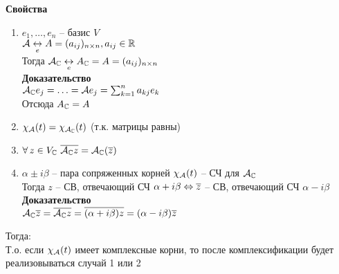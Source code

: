 \documentclass[12pt]{article}
\begin{document}
\textbf{Свойства}
\begin{enumerate}
    \item $e_1, \ldots, e_n$ -- базис $V$\\
    $\mathcal{A} \underset{e}{\leftrightarrow} A = (a_{ij})_{n\times n}, a_{ij} \in \mathbb{R}$\\
    Тогда $\mathcal{A}_\mathbb{C} \underset e{\leftrightarrow} A_\mathbb{C} = A = (a_{ij})_{n\times n}$\\
    \textbf{Доказательство}\\
    $\mathcal{A}_\mathbb{C} e_j = \ldots = \mathcal{A} e_j = \sum_{k=1}^n a_{kj}e_k$\\
    Отсюда $A_\mathbb{C} = A$
    \item $\chi_\mathcal{A}(t) = \chi_{\mathcal{A}_\mathbb{C}}(t)$ (т.к. матрицы равны)
    \item $\forall\, z \in V_\mathbb{C}\ \overline{\mathcal{A}_\mathbb{C} z} = \mathcal{A}_\mathbb{C}(\overline z)$
    \item $\alpha\pm  i\beta$ -- пара сопряженных корней $\chi_\mathcal{A}(t)$ -- СЧ для $\mathcal{A}_\mathbb{C}$\\
    Тогда $z$ -- СВ, отвечающий СЧ $\alpha + i \beta \Leftrightarrow \overline z$ -- СВ, отвечающий СЧ $\alpha - i \beta$\\
    \textbf{Доказательство}\\
    $\mathcal{A}_\mathbb{C} \overline z = \overline{\mathcal{A}_\mathbb{C} z} = \overline {(\alpha+i\beta)z} = (\alpha - i\beta)\overline{z}$
\end{enumerate}
Тогда:\\
Т.о. если $\chi_\mathcal{A}(t)$ имеет комплексные корни, то после комплексификации будет реализовываться случай 1 или 2
\end{document}
